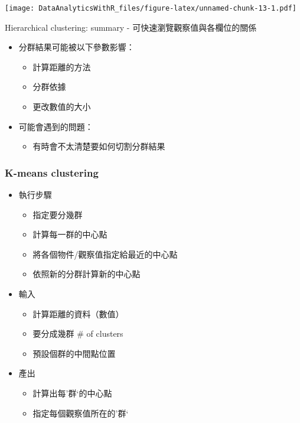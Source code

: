 \documentclass[]{book}
\providecommand{\tightlist}{%
  \setlength{\itemsep}{0pt}\setlength{\parskip}{0pt}}
\begin{document}
\texttt{[image: DataAnalyticsWithR\_files/figure-latex/unnamed-chunk-13-1.pdf]}

Hierarchical clustering: summary - 可快速瀏覽觀察值與各欄位的關係

\begin{itemize}
\tightlist
\item
  分群結果可能被以下參數影響：

  \begin{itemize}
  \tightlist
  \item
    計算距離的方法
  \item
    分群依據
  \item
    更改數值的大小
  \end{itemize}
\item
  可能會遇到的問題：

  \begin{itemize}
  \tightlist
  \item
    有時會不太清楚要如何切割分群結果
  \end{itemize}
\end{itemize}

\subsubsection{K-means clustering}\label{k-means-clustering}

\begin{itemize}
\tightlist
\item
  執行步驟

  \begin{itemize}
  \tightlist
  \item
    指定要分幾群
  \item
    計算每一群的中心點
  \item
    將各個物件/觀察值指定給最近的中心點
  \item
    依照新的分群計算新的中心點
  \end{itemize}
\item
  輸入

  \begin{itemize}
  \tightlist
  \item
    計算距離的資料（數值）
  \item
    要分成幾群 \# of clusters
  \item
    預設個群的中間點位置
  \end{itemize}
\item
  產出

  \begin{itemize}
  \tightlist
  \item
    計算出每'群`的中心點
  \item
    指定每個觀察值所在的'群`
  \end{itemize}
\end{itemize}
\end{document}

